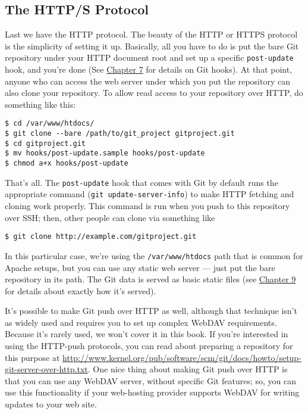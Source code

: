 \documentclass[a4paper]{book}
\newcommand{\prechap}{Chapter }
\newcommand{\postchap}{}
\newcommand{\chapref}[1]{\hyperref[chap:#1]{\prechap #1\postchap}}
\begin{document}
\subsection{The HTTP/S Protocol}

Last we have the HTTP protocol. The beauty of the HTTP or HTTPS protocol is the simplicity of setting it up. Basically, all you have to do is put the bare Git repository under your HTTP document root and set up a specific \texttt{post-update} hook, and you're done (See \chapref{7} for details on Git hooks). At that point, anyone who can access the web server under which you put the repository can also clone your repository. To allow read access to your repository over HTTP, do something like this:

\begin{shaded}\begin{verbatim}
$ cd /var/www/htdocs/
$ git clone --bare /path/to/git_project gitproject.git
$ cd gitproject.git
$ mv hooks/post-update.sample hooks/post-update
$ chmod a+x hooks/post-update
\end{verbatim}\end{shaded}

That's all. The \texttt{post-update} hook that comes with Git by default runs the appropriate command (\texttt{git update-server-info}) to make HTTP fetching and cloning work properly. This command is run when you push to this repository over SSH; then, other people can clone via something like

\begin{shaded}\begin{verbatim}
$ git clone http://example.com/gitproject.git
\end{verbatim}\end{shaded}

In this particular case, we're using the \texttt{/var/www/htdocs} path that is common for Apache setups, but you can use any static web server --- just put the bare repository in its path. The Git data is served as basic static files (see \chapref{9} for details about exactly how it's served).

It's possible to make Git push over HTTP as well, although that technique isn't as widely used and requires you to set up complex WebDAV requirements. Because it's rarely used, we won't cover it in this book. If you're interested in using the HTTP-push protocols, you can read about preparing a repository for this purpose at \url{http://www.kernel.org/pub/software/scm/git/docs/howto/setup-git-server-over-http.txt}. One nice thing about making Git push over HTTP is that you can use any WebDAV server, without specific Git features; so, you can use this functionality if your web-hosting provider supports WebDAV for writing updates to your web site.
\end{document}
